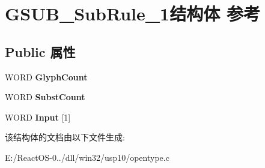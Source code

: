 \hypertarget{struct_g_s_u_b___sub_rule__1}{}\section{G\+S\+U\+B\+\_\+\+Sub\+Rule\+\_\+1结构体 参考}
\label{struct_g_s_u_b___sub_rule__1}
\subsection*{Public 属性}
\begin{DoxyCompactItemize}
\item 
\mbox{\label{struct_g_s_u_b___sub_rule__1_ab6a5344ef2a84ca6b85f007bbe5ff767}} 
W\+O\+RD {\bfseries Glyph\+Count}
\item 
\mbox{\label{struct_g_s_u_b___sub_rule__1_a6827f7ec1b3c6a821f1686eb5c597977}} 
W\+O\+RD {\bfseries Subst\+Count}
\item 
\mbox{\label{struct_g_s_u_b___sub_rule__1_a859f1e8958e96fc3c17608f5d5926718}} 
W\+O\+RD {\bfseries Input} \mbox{[}1\mbox{]}
\end{DoxyCompactItemize}


该结构体的文档由以下文件生成\+:\begin{DoxyCompactItemize}
\item 
E\+:/\+React\+O\+S-\/0../dll/win32/usp10/opentype.\+c\end{DoxyCompactItemize}

